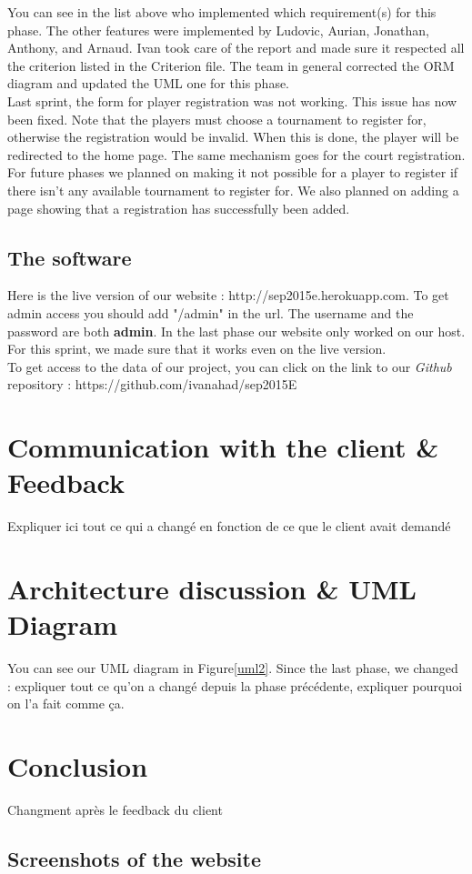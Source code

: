 \documentclass[a4paper, 12pt]{article}
\begin{document}
You can see in the list above who implemented which requirement(s) for this phase. The other features were implemented by Ludovic, Aurian, Jonathan, Anthony, and Arnaud. Ivan took care of the report and made sure it respected all the criterion listed in the Criterion file. The team in general corrected the ORM diagram and updated the UML one for this phase. \\

Last sprint, the form for player registration was not working. This issue has now been fixed. Note that the players must choose a tournament to register for, otherwise the registration would be invalid. When this is done, the player will be redirected to the home page. The same mechanism goes for the court registration.  For future phases we planned on making it not possible for a player to register if there isn't any available tournament to register for. We also planned on adding a page showing that a registration has successfully been added.\\

\subsection{The software}

Here is the live version of our website : http://sep2015e.herokuapp.com.  To get admin access you should add "/admin" in the url. The username and the password are both \textbf{admin}. In the last phase our website only worked on our host. For this sprint, we made sure that it works even on the live version.\\

To get access to the data of our project, you can click on the link to our \textit{Github} repository : https://github.com/ivanahad/sep2015E\\ 
\section{Communication with the client \& Feedback}
Expliquer ici tout ce qui a changé en fonction de ce que le client avait demandé
 
\newpage
\section{Architecture discussion \& UML Diagram}

You can see our UML diagram in Figure\ref{uml2}. Since the last phase, we changed : expliquer tout ce qu'on a changé depuis la phase précédente, expliquer pourquoi on l'a fait comme ça.



\section{Conclusion}
Changment après le feedback du client

\begin{appendices}
\section*{Screenshots of the website}
\noindent

\end{appendices}
\end{document}
